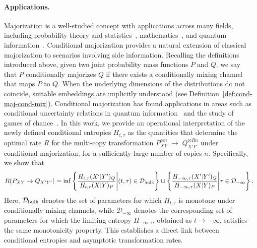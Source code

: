 \documentclass[aps,pra,11pt,onecolumn,nofootinbib,tightenlines]{revtex4-2}
\theoremstyle{definition}
\newcommand{\D}{\mathcal{D}}
\newcommand{\mc}[1]{\mathcal{#1}}
\begin{document}
\paragraph*{Applications.}

Majorization is a well-studied concept with applications across many fields, including probability theory and statistics~\cite{marshall1979inequalities}, mathematics~\cite{bhatia1997graduate}, and quantum information~\cite{nielsen1999conditions,horodecki2013fundamental}. Conditional majorization provides a natural extension of classical majorization to scenarios involving side information. Recalling the definitions introduced above, given two joint probability mass functions $P$ and $Q$, we say that $P$ conditionally majorizes $Q$ if there exists a conditionally mixing channel that maps $P$ to $Q$. When the underlying dimensions of the distributions do not coincide, suitable embeddings are implicitly understood (see Definition~\ref{def:cond-maj-cond-mix}).
Conditional majorization has found applications in areas such as conditional uncertainty relations in quantum information~\cite{gour2018conditional} and the study of games of chance~\cite{brandsen2022entropy}. 
In this work, we provide an operational interpretation of the newly defined conditional entropies $H_{t,\tau}$ as the quantities that determine the optimal rate $R$ for the multi-copy transformation $ P_{XY}^{\otimes n} \;\longrightarrow\; Q_{X'Y'}^{\otimes R n}$
under conditional majorization, for a sufficiently large number of copies $n$. Specifically, we show that
\begin{equation}
R(P_{XY}\rightarrow Q_{X'Y'}) = \inf\left\{ \frac{H_{t,\tau}(X'|Y')_Q}{H_{t,\tau}(X|Y)_P}\Bigg| (t,\tau) \in \D_{\rm{bulk}}\right\} \cup \left\{ \frac{H_{-\infty,\tau}(X'|Y')_Q}{H_{-\infty,\tau}(X|Y)_P}\Bigg| \tau \in \D_{-\infty}\right\}.
\end{equation}
Here, \(\mc D_{\rm bulk}\) denotes the set of parameters for which \(H_{t,\tau}\) is monotone under conditionally mixing channels, while \(\mc D_{-\infty}\) denotes the corresponding set of parameters for which the limiting entropy \(H_{-\infty,\tau}\), obtained as \(t \to -\infty\), satisfies the same monotonicity property.
This establishes a direct link between conditional entropies and asymptotic transformation rates.

\medskip
\end{document}
